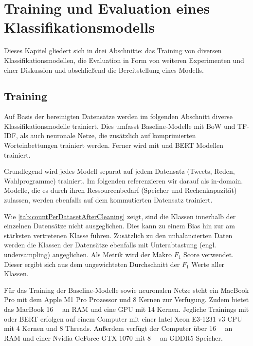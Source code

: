 
\chapter{Training und Evaluation eines Klassifikationsmodells} \label{ch:crispDm_2}

Dieses Kapitel gliedert sich in drei Abschnitte: das Training von diversen Klassifikationsmodellen, die Evaluation in Form von weiteren Experimenten und einer Diskussion und abschließend die Bereitstellung eines Modells.

\section{Training} \label{sec:modeling}


Auf Basis der bereinigten Datensätze werden im folgenden Abschnitt diverse Klassifikationsmodelle trainiert. Dies umfasst Baseline-Modelle mit \ac{BoW} und \ac{TF-IDF}, als auch neuronale Netze, die zusätzlich auf komprimierten Worteinbettungen trainiert werden. Ferner wird mit \ft und \ac{BERT} Modellen trainiert.

Grundlegend wird jedes Modell separat auf jedem Datensatz (Tweets, Reden, Wahlprogramme) trainiert. Im folgenden referenzieren wir darauf als in-domain. Modelle, die es durch ihren Ressourcenbedarf (Speicher und Rechenkapazität) zulassen, werden ebenfalls auf dem kommutierten Datensatz trainiert. 


Wie \autoref{tab:countPerDatasetAfterCleaning} zeigt, sind die Klassen innerhalb der einzelnen Datensätze nicht ausgeglichen. Dies kann zu einem Bias hin zur am stärksten vertretenen Klasse führen. Zusätzlich zu den unbalancierten Daten werden die Klassen der Datensätze ebenfalls mit Unterabtastung (engl. undersampling) angeglichen. Als Metrik wird der Makro \(F_1\) Score verwendet. Dieser ergibt sich aus dem ungewichteten Durchschnitt der \(F_1\) Werte aller Klassen.

Für das Training der Baseline-Modelle sowie neuronalen Netze steht ein MacBook Pro mit dem Apple M1 Pro Prozessor und \num{8} Kernen zur Verfügung. Zudem bietet das MacBook \SI{16}{\giga\byte} an \ac{RAM} und eine \ac{GPU} mit \num{14} Kernen. Jegliche Trainings mit \ft oder \ac{BERT} erfolgen auf einem Computer mit einer Intel Xeon E3-1231 v3 \ac{CPU} mit \num{4} Kernen und \num{8} Threads. Außerdem verfügt der Computer über \SI{16}{\giga\byte} an \ac{RAM} und einer Nvidia GeForce GTX 1070 mit \SI{8}{\giga\byte} an \ac{GDDR5} Speicher.

